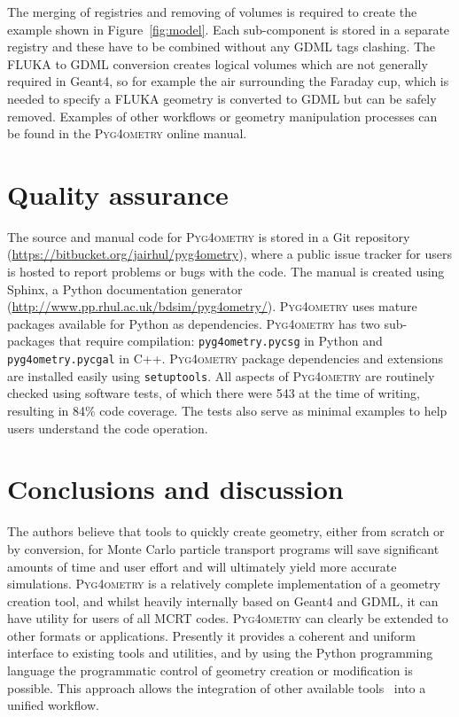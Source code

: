 \documentclass[final,5p,times,twocolumn]{elsarticle}
\newcommand{\pyinline}[1]{\lstinline[postbreak={}]{#1}}
\newcommand{\PYGEOMETRY}{\textsc{Pyg4ometry}}
\begin{document}
The merging of registries and removing of volumes is required to create the example shown in Figure~\ref{fig:model}.
Each sub-component is stored in a separate registry and these have to be combined without any GDML tags clashing.
The FLUKA to GDML conversion creates logical volumes which are not generally required in Geant4, so for example
the air surrounding the Faraday cup, which is needed to specify a FLUKA geometry is converted to GDML but can be
safely removed. Examples of other workflows or geometry manipulation processes can be found in
the \PYGEOMETRY{} online manual.

\section{Quality assurance}
The source and manual code for \PYGEOMETRY{} is stored in a Git repository (\url{https://bitbucket.org/jairhul/pyg4ometry}),
where a public issue tracker for users is hosted to report problems or bugs with the code. The manual is created using Sphinx, a
Python documentation generator (\url{http://www.pp.rhul.ac.uk/bdsim/pyg4ometry/}). \PYGEOMETRY{} uses mature packages
available for Python as dependencies. \PYGEOMETRY{} has  two sub-packages
that require compilation: \pyinline{pyg4ometry.pycsg} in Python and
\pyinline{pyg4ometry.pycgal} in C++.
\PYGEOMETRY{} package dependencies and extensions are installed easily using
\pyinline{setuptools}. All aspects of \PYGEOMETRY{} are routinely checked
using software tests, of which there were 543 at the time of writing,
resulting in 84\% code coverage. The tests also serve as minimal examples to help users understand the code operation.

\section{Conclusions and discussion}
The authors believe that tools to quickly create geometry, either from scratch or by conversion,
for Monte Carlo particle transport programs
will save significant amounts of time and user effort and will ultimately
yield more accurate simulations. \PYGEOMETRY{} is a relatively complete implementation of a geometry
creation tool, and whilst heavily internally based on Geant4 and GDML, it can have utility for users of all MCRT
codes. \PYGEOMETRY{} can clearly be extended to other formats or applications. Presently it provides a coherent and
uniform interface to existing tools and utilities, and by using the Python programming language
 the programmatic control of geometry creation or modification is possible. This approach allows the integration of
other available tools~\cite{DavisNIMA915-65} into a unified workflow.
\end{document}
